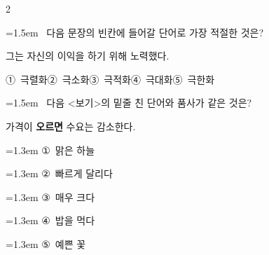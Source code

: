 \documentclass[10pt, a4paper]{article}
\begin{document}
\begin{multicols}{2}
\noindent\begin{minipage}{\columnwidth}
\vspace{2mm}
{\hangindent=1.5em  ~다음 문장의 빈칸에 들어갈 단어로 가장 적절한 것은?\par}

\vspace{1mm}
\begin{boxibox}
그는 자신의 이익을 \underline{\hspace{3cm}}하기 위해 노력했다. \\
\end{boxibox}
\vspace{1mm}

\vspace{0.5mm}
\noindent
\mbox{①~극렬화}\hspace{1em}\mbox{②~극소화}\hspace{1em}\mbox{③~극적화}\hspace{1em}\mbox{④~극대화}\hspace{1em}\mbox{⑤~극한화}

\vspace{4mm}
\end{minipage}
\par

\noindent\begin{minipage}{\columnwidth}
\vspace{2mm}
{\hangindent=1.5em  ~다음 <보기>의 밑줄 친 단어와 품사가 같은 것은?\par}

\vspace{1mm}
\begin{boxibox}
가격이 \textbf{오르면} 수요는 감소한다. \\
\end{boxibox}
\vspace{1mm}

\vspace{0.5mm}
{\hangindent=1.3em  \noindent\hspace{0.3em}①~맑은 하늘\par}
{\hangindent=1.3em  \noindent\hspace{0.3em}②~빠르게 달리다\par}
{\hangindent=1.3em  \noindent\hspace{0.3em}③~매우 크다\par}
{\hangindent=1.3em  \noindent\hspace{0.3em}④~밥을 먹다\par}
{\hangindent=1.3em  \noindent\hspace{0.3em}⑤~예쁜 꽃\par}
\vspace{4mm}
\end{minipage}
\par


\end{multicols}
\end{document}

